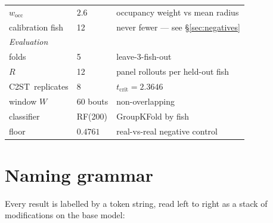 \documentclass[11pt,a4paper]{article}
\newcommand{\ctst}{C2ST}
\begin{document}
\begin{center}
\begin{tabular}{llp{}}
$w_{\mathrm{occ}}$ & $2.6$ & occupancy weight vs mean radius \\
calibration fish & 12 & never fewer --- see \S\ref{sec:negatives} \\
\midrule
\multicolumn{3}{l}{\textit{Evaluation}}\\
folds & 5 & leave-3-fish-out \\
$R$ & 12 & panel rollouts per held-out fish \\
\ctst\ replicates & 8 & $t_{\mathrm{crit}} = 2.3646$ \\
window $W$ & 60 bouts & non-overlapping \\
classifier & RF(200) & GroupKFold by fish \\
floor & $0.4761$ & real-vs-real negative control \\
\bottomrule
\end{tabular}
\end{center}

\section{Naming grammar}

Every result is labelled by a token string, read left to right as a stack of
modifications on the base model:
\end{document}
